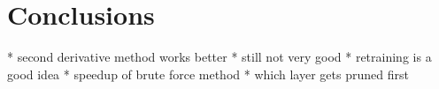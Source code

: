 \section{Conclusions}

* second derivative method works better
* still not very good
* retraining is a good idea
* speedup of brute force method
* which layer gets pruned first